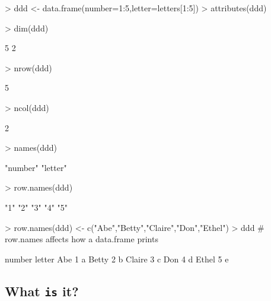 %
%
%
%
%
%
%
%

\begin{Schunk}
\begin{Sinput}
> ddd <- data.frame(number=1:5,letter=letters[1:5])
> attributes(ddd)
\end{Sinput}
\begin{Sinput}
> dim(ddd)
\end{Sinput}
\begin{Soutput}
[1] 5 2
\end{Soutput}
\begin{Sinput}
> nrow(ddd)
\end{Sinput}
\begin{Soutput}
[1] 5
\end{Soutput}
\begin{Sinput}
> ncol(ddd)
\end{Sinput}
\begin{Soutput}
[1] 2
\end{Soutput}
\begin{Sinput}
> names(ddd)
\end{Sinput}
\begin{Soutput}
[1] "number" "letter"
\end{Soutput}
\begin{Sinput}
> row.names(ddd)
\end{Sinput}
\begin{Soutput}
[1] "1" "2" "3" "4" "5"
\end{Soutput}
\begin{Sinput}
> row.names(ddd) <- c("Abe","Betty","Claire","Don","Ethel")
> ddd                 # row.names affects how a data.frame prints
\end{Sinput}
\begin{Soutput}
       number letter
Abe         1      a
Betty       2      b
Claire      3      c
Don         4      d
Ethel       5      e
\end{Soutput}
\end{Schunk}

\subsection{What \texttt{is} it?}

